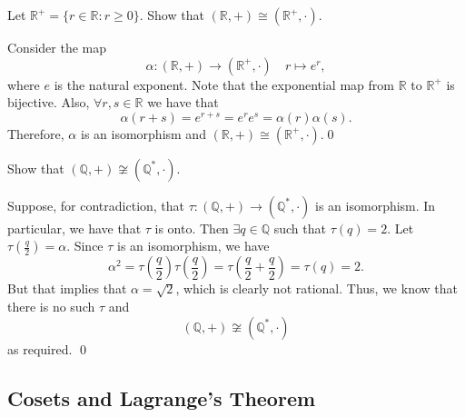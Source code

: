 \documentclass[notoc,notitlepage]{tufte-book}
\begin{document}
\begin{eg}
  Let $\mathbb{R}^+ = \{r \in \mathbb{R} : r \geq 0 \}$. Show that $(\mathbb{R}, +) \cong (\mathbb{R}^+, \cdot)$.

  \begin{solution}
    Consider the map
    \begin{equation*}
      \alpha : (\mathbb{R}, +) \to (\mathbb{R}^+, \cdot) \quad r \mapsto e^r,
    \end{equation*}
    where $e$ is the natural exponent. Note that the exponential map from $\mathbb{R}$ to $\mathbb{R}^+$ is bijective. Also, $\forall r, s \in \mathbb{R}$ we have that
    \begin{equation*}
      \alpha(r + s) = e^{r + s} = e^r e^s = \alpha(r) \alpha(s).
    \end{equation*}
    Therefore, $\alpha$ is an isomorphism and $(\mathbb{R}, +) \cong (\mathbb{R}^+, \cdot)$.\qed
  \end{solution}
\end{eg}

\begin{eg}
  Show that $(\mathbb{Q}, +) \not\cong (\mathbb{Q}^*, \cdot)$.

  \begin{solution}
    Suppose, for contradiction, that $\tau : (\mathbb{Q}, +) \to (\mathbb{Q}^*, \cdot)$ is an isomorphism. In particular, we have that $\tau$ is onto. Then $\exists q \in \mathbb{Q}$ such that $\tau(q) = 2$. Let $\tau(\frac{q}{2}) = \alpha$. Since $\tau$ is an isomorphism, we have
    \begin{equation*}
      \alpha^2 = \tau(\frac{q}{2}) \tau(\frac{q}{2}) = \tau(\frac{q}{2} + \frac{q}{2}) = \tau(q) = 2.
    \end{equation*}
    But that implies that $\alpha = \sqrt{2}$, which is clearly not rational. Thus, we know that there is no such $\tau$ and
    \begin{equation*}
      (\mathbb{Q}, +) \not\cong (\mathbb{Q}^*, \cdot)
    \end{equation*}
    as required. \qed
  \end{solution}
\end{eg}


\subsection{Cosets and Lagrange's Theorem}%
\label{sub:cosets_and_lagrange_s_theorem}
\end{document}
